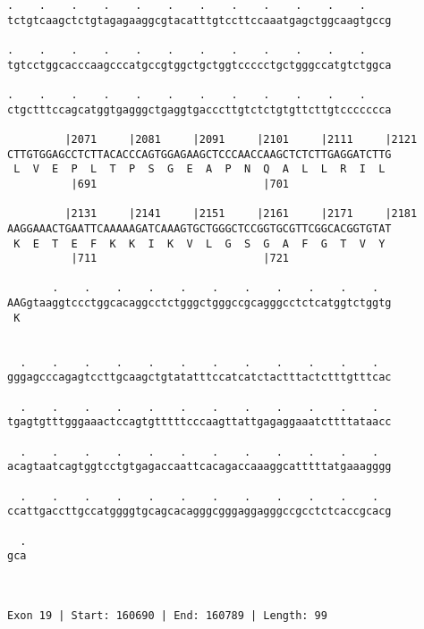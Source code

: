 \documentclass{article}
\begin{document}
\begin{Verbatim}
.    .    .    .    .    .    .    .    .    .    .    .    
tctgtcaagctctgtagagaaggcgtacatttgtccttccaaatgagctggcaagtgccg
                                                            
.    .    .    .    .    .    .    .    .    .    .    .    
tgtcctggcacccaagcccatgccgtggctgctggtccccctgctgggccatgtctggca
                                                            
.    .    .    .    .    .    .    .    .    .    .    .    
ctgctttccagcatggtgagggctgaggtgacccttgtctctgtgttcttgtccccccca
                                                            
         |2071     |2081     |2091     |2101     |2111     |2121
CTTGTGGAGCCTCTTACACCCAGTGGAGAAGCTCCCAACCAAGCTCTCTTGAGGATCTTG
 L  V  E  P  L  T  P  S  G  E  A  P  N  Q  A  L  L  R  I  L 
          |691                          |701                
  
         |2131     |2141     |2151     |2161     |2171     |2181
AAGGAAACTGAATTCAAAAAGATCAAAGTGCTGGGCTCCGGTGCGTTCGGCACGGTGTAT
 K  E  T  E  F  K  K  I  K  V  L  G  S  G  A  F  G  T  V  Y 
          |711                          |721                
  
       .    .    .    .    .    .    .    .    .    .    .  
AAGgtaaggtccctggcacaggcctctgggctgggccgcagggcctctcatggtctggtg
 K                                                          
                                                            
  
  .    .    .    .    .    .    .    .    .    .    .    .  
gggagcccagagtccttgcaagctgtatatttccatcatctactttactctttgtttcac
                                                            
  .    .    .    .    .    .    .    .    .    .    .    .  
tgagtgtttgggaaactccagtgtttttcccaagttattgagaggaaatcttttataacc
                                                            
  .    .    .    .    .    .    .    .    .    .    .    .  
acagtaatcagtggtcctgtgagaccaattcacagaccaaaggcatttttatgaaagggg
                                                            
  .    .    .    .    .    .    .    .    .    .    .    .  
ccattgaccttgccatggggtgcagcacagggcgggaggagggccgcctctcaccgcacg
                                                            
  .
gca
   
   
 
Exon 19 | Start: 160690 | End: 160789 | Length: 99
 

\end{Verbatim}
\end{document}
